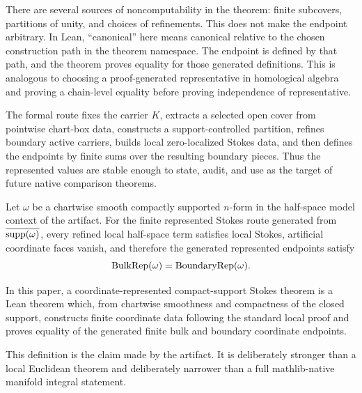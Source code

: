 There are several sources of noncomputability in the theorem: finite
subcovers, partitions of unity, and choices of refinements.  This does not make
the endpoint arbitrary.  In Lean, ``canonical'' here means canonical relative
to the chosen construction path in the theorem namespace.  The endpoint is
defined by that path, and the theorem proves equality for those generated
definitions.  This is analogous to choosing a proof-generated representative
in homological algebra and proving a chain-level equality before proving
independence of representative.

The formal route fixes the carrier \(K\), extracts a selected open cover from
pointwise chart-box data, constructs a support-controlled partition, refines
boundary active carriers, builds local zero-localized Stokes data, and then
defines the endpoints by finite sums over the resulting boundary pieces.  Thus
the represented values are stable enough to state, audit, and use as the target
of future native comparison theorems.

\begin{theorem}
Let \(\omega\) be a chartwise smooth compactly supported \(n\)-form in the
half-space model context of the artifact.  For the finite represented Stokes
route generated from \(\overline{\operatorname{supp}(\omega)}\), every refined local
half-space term satisfies local Stokes, artificial coordinate faces vanish, and
therefore the generated represented endpoints satisfy
\[
  \operatorname{BulkRep}(\omega)=\operatorname{BoundaryRep}(\omega).
\]
\end{theorem}

\begin{definition}
In this paper, a coordinate-represented compact-support Stokes theorem is a
Lean theorem which, from chartwise smoothness and compactness of the closed
support, constructs finite coordinate data following the standard local proof
and proves equality of the generated finite bulk and boundary coordinate
endpoints.
\end{definition}

This definition is the claim made by the artifact.  It is deliberately stronger
than a local Euclidean theorem and deliberately narrower than a full
mathlib-native manifold integral statement.
